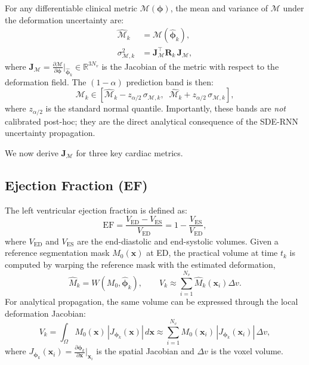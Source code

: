 \documentclass[10pt,twocolumn]{article}
\newcommand{\R}{\mathbb{R}}
\begin{document}
For any differentiable clinical metric $\mathcal{M}(\bm{\phi})$, the mean and variance of $\mathcal{M}$ under the deformation uncertainty are:
\begin{align}
    \hat{\mathcal{M}}_k &= \mathcal{M}(\hat{\bm{\phi}}_k), \label{eq:metric_mean} \\
    \sigma^2_{\mathcal{M},k} &= \bm{J}_{\mathcal{M}}^\top \bm{R}_k \, \bm{J}_{\mathcal{M}}, \label{eq:metric_var}
\end{align}
where $\bm{J}_{\mathcal{M}} = \frac{\partial \mathcal{M}}{\partial \bm{\phi}}\big|_{\hat{\bm{\phi}}_k} \in \R^{3N_v}$ is the Jacobian of the metric with respect to the deformation field. The $(1-\alpha)$ prediction band is then:
\begin{equation}
    \mathcal{M}_k \in \left[\hat{\mathcal{M}}_k - z_{\alpha/2}\,\sigma_{\mathcal{M},k}, \;\; \hat{\mathcal{M}}_k + z_{\alpha/2}\,\sigma_{\mathcal{M},k}\right],
    \label{eq:pred_band}
\end{equation}
where $z_{\alpha/2}$ is the standard normal quantile. Importantly, these bands are \emph{not} calibrated post-hoc; they are the direct analytical consequence of the SDE-RNN uncertainty propagation.

We now derive $\bm{J}_{\mathcal{M}}$ for three key cardiac metrics.

\subsection{Ejection Fraction (EF)}

The left ventricular ejection fraction is defined as:
\begin{equation}
    \text{EF} = \frac{V_{\text{ED}} - V_{\text{ES}}}{V_{\text{ED}}} = 1 - \frac{V_{\text{ES}}}{V_{\text{ED}}},
    \label{eq:ef_def}
\end{equation}
where $V_{\text{ED}}$ and $V_{\text{ES}}$ are the end-diastolic and end-systolic volumes. Given a reference segmentation mask $M_0(\bm{x})$ at ED, the practical volume at time $t_k$ is computed by warping the reference mask with the estimated deformation,
\begin{equation}
    \widehat M_k = W(M_0,\widehat{\bm{\phi}}_k),
    \qquad
    V_k \approx \sum_{i=1}^{N_v}\widehat M_k(\bm{x}_i)\Delta v .
    \label{eq:warped_volume}
\end{equation}
For analytical propagation, the same volume can be expressed through the local deformation Jacobian:
\begin{equation}
    V_k = \int_\Omega M_0(\bm{x}) \, |J_{\bm{\phi}_k}(\bm{x})| \, d\bm{x} \approx \sum_{i=1}^{N_v} M_0(\bm{x}_i) \, |J_{\bm{\phi}_k}(\bm{x}_i)| \, \Delta v,
    \label{eq:volume}
\end{equation}
where $J_{\bm{\phi}_k}(\bm{x}_i) = \frac{\partial \bm{\phi}_k}{\partial \bm{x}}\big|_{\bm{x}_i}$ is the spatial Jacobian and $\Delta v$ is the voxel volume.
\end{document}
